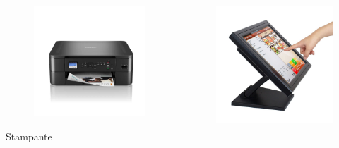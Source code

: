 \documentclass[]{beamer}
\begin{document}
\begin{frame}
\begin{columns}
\begin{column}{.22\textwidth}
\begin{center}
\begin{figure}
      \includegraphics[width=\columnwidth]{img/stampante.jpg}
    \end{figure}
    Stampante
    \end{center}
\end{column}
\begin{column}{.22\textwidth}
  \begin{center} 
    \begin{figure}
      \includegraphics[width=\columnwidth]{img/touchscreen.jpg}

\end{figure}
\end{center}
\end{column}
\end{columns}
\end{frame}
\end{document}
